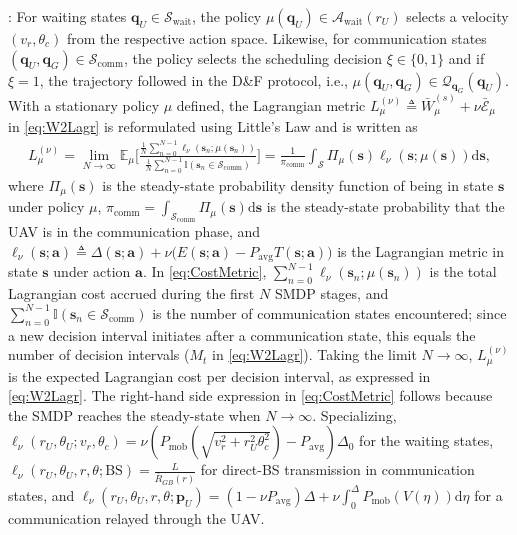 \documentclass[12pt, draftcls, onecolumn]{IEEEtran}
\theoremstyle{plain}
\theoremstyle{definition}
\theoremstyle{remark}
\begin{document}
: For waiting states $\mathbf{q}_{U}{\in}\mathcal{S}_{\mathrm{wait}}$, the policy  $\mu(\mathbf{q}_{U}){\in}\mathcal{A}_{\mathrm{wait}}(r_{U})$ selects a velocity $(v_{r},\theta_{c})$ from the respective action space. Likewise, for communication states $(\mathbf{q}_{U},\mathbf{q}_{G}){\in}\mathcal{S}_{\mathrm{comm}}$, the policy selects the scheduling decision $\xi{\in}\{0,1\}$ and if $\xi{=}1$, the trajectory followed in the D\&F protocol, i.e., $\mu(\mathbf{q}_{U},\mathbf{q}_{G}){\in} \mathcal Q_{\mathbf q_G} (\mathbf q_U)$. With a stationary policy $\mu$ defined, the Lagrangian metric $L_{\mu}^{(\nu)}{\triangleq}\bar{W}_{\mu}^{(s)}{+}\nu\bar{\mathcal E}_{\mu}$ in \eqref{eq:W2Lagr} is reformulated using Little's Law \cite{LittlesLaw} and is written as 
\begin{align}\label{eq:CostMetric}
    L_\mu^{(\nu)} = \lim_{N \rightarrow \infty} \mathbb{E}_\mu \Bigg[ \frac{\frac{1}{N}\sum_{n=0}^{N-1}  \ell_\nu(\mathbf{s}_n; \mu(\mathbf{s}_n)) }{\frac{1}{N}\sum_{n = 0}^{N-1} \mathbb I(\mathbf{s}_n \in \mathcal{S}_{\mathrm{comm}})}  \Bigg] = \frac{1}{\pi_{\mathrm{comm}}}\int_{\mathcal{S}} \Pi_{\mu}(\mathbf{s})\ell_\nu(\mathbf{s}; \mu(\mathbf{s}))\mathrm{d}\mathbf{s},
\end{align}
where $\Pi_{\mu}(\mathbf{s})$ is the steady-state probability density function of being in state $\mathbf{s}$ under policy $\mu$, $\pi_{\mathrm{comm}}{=}\int_{\mathcal{S}_{\mathrm{comm}}}\!\!\!\!\!\Pi_{\mu}(\mathbf{s})\mathrm{d}\mathbf{s}$ is the steady-state probability that the UAV is in the communication phase, and $\ell_{\nu}(\mathbf{s};\mathbf{a}){\triangleq}\Delta(\mathbf{s};\mathbf{a}){+}\nu\big(E(\mathbf{s};\mathbf{a}){-}P_{\mathrm{avg}}T(\mathbf{s};\mathbf{a})\big)$ is the Lagrangian metric in state $\mathbf{s}$ under action $\mathbf{a}$. In \eqref{eq:CostMetric}, $\sum_{n=0}^{N{-}1}\ell_{\nu}(\mathbf{s}_{n};\mu(\mathbf{s}_{n}))$ is the total Lagrangian cost accrued during the first $N$ SMDP stages, and $\sum_{n{=}0}^{N{-}1}\mathbb{I}(\mathbf{s}_{n}{\in}\mathcal{S}_{\mathrm{comm}})$ is the number of communication states encountered; since a new decision interval initiates after a communication state, this equals the number of decision intervals ($M_t$ in \eqref{eq:W2Lagr}). Taking the limit $N{\to}\infty$, $L_{\mu}^{(\nu)}$ is the expected Lagrangian cost per decision interval, as expressed in \eqref{eq:W2Lagr}. The right-hand side expression in \eqref{eq:CostMetric} follows because the SMDP reaches the steady-state when $N{\to}\infty$. Specializing, $\ell_{\nu}(r_{U},\theta_{U};v_{r},\theta_{c}){=}\nu(P_{\mathrm{mob}}(\sqrt{v_{r}^{2}{+}r_{U}^{2}\theta_{c}^{2}}){-}P_{\mathrm{avg}})\Delta_{0}$ for the waiting states, $\ell_{\nu}(r_{U},\theta_{U},r,\theta; \mathrm{BS}){=}\frac{L}{\bar{R}_{GB}(r)}$ for direct-BS transmission in communication states, and $\ell_{\nu}(r_{U},\theta_{U},r,\theta;\mathbf{p}_{U}){=}(1{-}\nu P_{\mathrm{avg}})\Delta{+}\nu\int_{0}^\Delta P_{\mathrm{mob}}\left(V(\eta)\right)\mathrm{d}\eta$ for a communication  relayed through the UAV.
\end{document}
